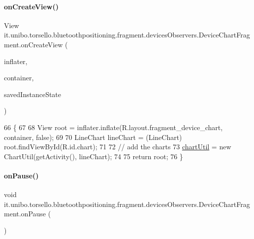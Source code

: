 \paragraph{\texorpdfstring{on\+Create\+View()}{onCreateView()}}
{\footnotesize\ttfamily View it.\+unibo.\+torsello.\+bluetoothpositioning.\+fragment.\+devices\+Observers.\+Device\+Chart\+Fragment.\+on\+Create\+View (\begin{DoxyParamCaption}\item[{Layout\+Inflater}]{inflater,  }\item[{View\+Group}]{container,  }\item[{Bundle}]{saved\+Instance\+State }\end{DoxyParamCaption})}


\begin{DoxyCode}
66                                                                                                       \{
67 
68         View root = inflater.inflate(R.layout.fragment\_device\_chart, container, \textcolor{keyword}{false});
69 
70         LineChart lineChart = (LineChart) root.findViewById(R.id.chart);
71 
72         \textcolor{comment}{// add the charts}
73         \hyperlink{classit_1_1unibo_1_1torsello_1_1bluetoothpositioning_1_1fragment_1_1devicesObservers_1_1DeviceChartFragment_afe4ee0e5d07f3efb6887428c9ef04a2e_afe4ee0e5d07f3efb6887428c9ef04a2e}{chartUtil} = \textcolor{keyword}{new} ChartUtil(getActivity(), lineChart);
74 
75         \textcolor{keywordflow}{return} root;
76     \}
\end{DoxyCode}
\hypertarget{classit_1_1unibo_1_1torsello_1_1bluetoothpositioning_1_1fragment_1_1devicesObservers_1_1DeviceChartFragment_a25bf98c9a715f133efd2f25b2f8aeb38_a25bf98c9a715f133efd2f25b2f8aeb38}{}\label{classit_1_1unibo_1_1torsello_1_1bluetoothpositioning_1_1fragment_1_1devicesObservers_1_1DeviceChartFragment_a25bf98c9a715f133efd2f25b2f8aeb38_a25bf98c9a715f133efd2f25b2f8aeb38} 
\paragraph{\texorpdfstring{on\+Pause()}{onPause()}}
{\footnotesize\ttfamily void it.\+unibo.\+torsello.\+bluetoothpositioning.\+fragment.\+devices\+Observers.\+Device\+Chart\+Fragment.\+on\+Pause (\begin{DoxyParamCaption}{ }\end{DoxyParamCaption})}


